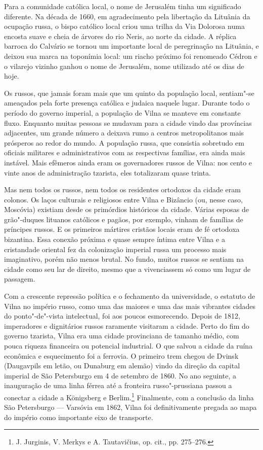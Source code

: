 Para a comunidade católica local, o nome de Jerusalém tinha um
significado diferente. Na década de 1660, em agradecimento pela
libertação da Lituânia da ocupação russa, o bispo católico local criou
uma trilha da Via Dolorosa numa encosta suave e cheia de árvores do rio
Neris, ao norte da cidade. A réplica barroca do Calvário se tornou um
importante local de peregrinação na Lituânia, e deixou sua marca na
toponímia local: um riacho próximo foi renomeado Cédron e o vilarejo
vizinho ganhou o nome de Jerusalém, nome utilizado até os dias de hoje.

Os russos, que jamais foram mais que um quinto da população local,
sentiam"-se ameaçados pela forte presença católica e judaica naquele
lugar. Durante todo o período do governo imperial, a população de Vilna
se manteve em constante fluxo. Enquanto muitas pessoas se mudavam para a
cidade vindo das províncias adjacentes, um grande número a deixava rumo
a centros metropolitanos mais prósperos ao redor do mundo. A população
russa, que consistia sobretudo em oficiais militares e administrativos
com as respectivas famílias, era ainda mais instável. Mais efêmeros
ainda eram os governadores russos de Vilna: nos cento e vinte anos de
administração tzarista, eles totalizaram quase trinta.

Mas nem todos os russos, nem todos os residentes ortodoxos da cidade
eram colonos. Os laços culturais e religiosos entre Vilna e Bizâncio
(ou, nesse caso, Moscóvia) existiam desde os primórdios históricos da
cidade. Várias esposas de grão"-duques lituanos católicos e pagãos, por
exemplo, vinham de famílias de príncipes russos. E os primeiros mártires
cristãos locais eram de fé ortodoxa bizantina. Essa conexão próxima e
quase sempre íntima entre Vilna e a cristandade oriental fez da
colonização imperial russa um processo mais imaginativo, porém não menos
brutal. No fundo, muitos russos se sentiam na cidade como seu lar de
direito, mesmo que a vivenciassem só como um lugar de passagem.

Com a crescente repressão política e o fechamento da universidade, o
estatuto de Vilna no império russo, como uma das maiores e uma das mais
vibrantes cidades do ponto"-de"-vista intelectual, foi aos poucos
esmorecendo. Depois de 1812, imperadores e dignitários russos raramente
visitaram a cidade. Perto do fim do governo tzarista, Vilna era uma
cidade provinciana de tamanho médio, com pouca riqueza financeira ou
potencial industrial. O que salvou a cidade da ruína econômica e
esquecimento foi a ferrovia. O primeiro trem chegou de Dvinsk
(Daugavpils em letão, ou Dunaburg em alemão) vindo da direção da capital
imperial de São Petersburgo em 4 de setembro de 1860. No ano seguinte, a
inauguração de uma linha férrea até a fronteira russo"-prussiana passou a
conectar a cidade a Königsberg e Berlim.\footnote{J. Jurginis, V. Merkys e A. Tautavičius, op. cit., pp. 275--276.} Finalmente, com a conclusão da linha São Petersburgo --- Varsóvia em 1862, Vilna foi
definitivamente pregada ao mapa do império como importante eixo de
transporte.

